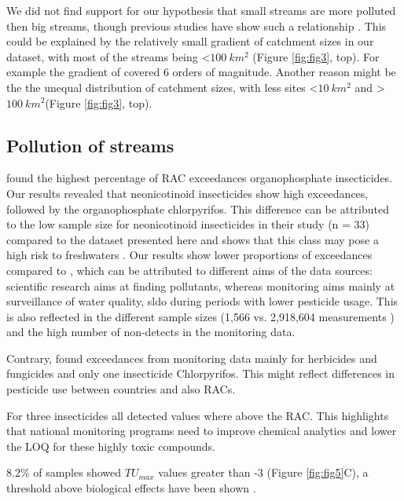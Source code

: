 \documentclass[journal=esthag,manuscript=article]{achemso}
\begin{document}
We did not find support for our hypothesis that small streams are more polluted then big streams, though previous studies have show such a relationship \citep{schulz_field_2004,stehle_pesticide_2015}.
This could be explained by the relatively small gradient of catchment sizes in our dataset, with most of the streams being \textless $100~km^2$ (Figure \ref{fig:fig3}, top).
For example the gradient of \citet{schulz_field_2004} covered 6 orders of magnitude.
Another reason might be the the unequal distribution of catchment sizes, with less sites \textless $10~km^2$ and \textgreater $100~km^2$(Figure \ref{fig:fig3}, top).



\subsection{Pollution of streams}


\citet{stehle_pesticide_2015} found the highest percentage of RAC exceedances organophosphate insecticides. 
Our results revealed that neonicotinoid insecticides show high exceedances, followed by the organophosphate chlorpyrifos. 
This difference can be attributed to the low sample size for neonicotinoid insecticides in their study (n = 33) compared to the dataset presented here  and shows that this class may pose a high risk to freshwaters .
Our results show lower proportions of exceedances compared to \citet{stehle_pesticide_2015}, which can be attributed to different aims of the data sources: scientific research aims at finding pollutants, whereas monitoring aims mainly at surveillance of water quality, sldo during periods with lower pesticide usage. 
This is also reflected in the different sample sizes (1,566 vs. 2,918,604 measurements ) and the high number of non-detects in the monitoring data.

Contrary, \citet{knauer_pesticides_2016} found exceedances from monitoring data mainly for herbicides and fungicides and only one insecticide Chlorpyrifos.
This might reflect differences in pesticide use between countries and also RACs.

For three insecticides all detected values where above the RAC.
This highlights that national monitoring programs need to improve chemical analytics and lower the LOQ for these highly toxic compounds.


8.2\% of samples showed $TU_{max}$ values greater than -3 (Figure \ref{fig:fig5}C), a threshold above biological effects have been shown \citep{schafer_thresholds_2012}.
\end{document}

